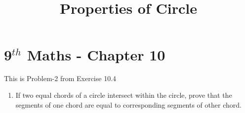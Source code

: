 \documentclass[10pt]{article}
\begin{document}
\begin{center}
\title{\textbf{Properties of Circle}}
\date{\vspace{-5ex}} %
\maketitle
\end{center}
\setcounter{page}{1}
\section{9$^{th}$ Maths - Chapter 10}
       This is Problem-2 from Exercise 10.4
\begin{enumerate}
\item If two equal chords of a circle intersect within the circle, prove that the segments of one chord are equal to corresponding segments of other chord.


\end{enumerate}
\end{document}
